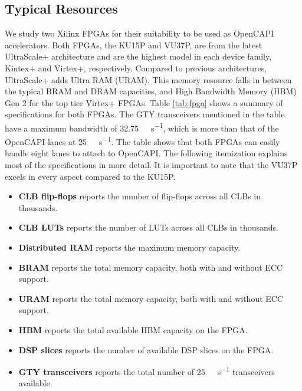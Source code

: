 \subsection{Typical Resources}
We study two Xilinx FPGAs for their suitability to be used as OpenCAPI accelerators. Both FPGAs, the KU15P and VU37P, are from the latest UltraScale+ architecture and are the highest model in each device family, Kintex+ and Virtex+, respectively. Compared to previous architectures, UltraScale+ adds Ultra RAM (URAM). This memory resource falls in between the typical BRAM and DRAM capacities, and High Bandwidth Memory (HBM) Gen 2 for the top tier Virtex+ FPGAs. Table \ref{tab:fpga} shows a summary of specifications for both FPGAs. The GTY transceivers mentioned in the table have a maximum bandwidth of \SI{32.75}{\giga\bit\per\second}, which is more than that of the OpenCAPI lanes at \SI{25}{\giga\bit\per\second}. The table shows that both FPGAs can easily handle eight lanes to attach to OpenCAPI. The following itemization explains most of the specifications in more detail. It is important to note that the VU37P excels in every aspect compared to the KU15P.
\begin{itemize}
  \item{\textbf{CLB flip-flops} reports the number of flip-flops across all CLBs in thousands.}
  \item{\textbf{CLB LUTs} reports the number of LUTs across all CLBs in thousands.}
  \item{\textbf{Distributed RAM} reports the maximum memory capacity.}
  \item{\textbf{BRAM} reports the total memory capacity, both with and without ECC support.}
  \item{\textbf{URAM} reports the total memory capacity, both with and without ECC support.}
  \item{\textbf{HBM} reports the total available HBM capacity on the FPGA.}
  \item{\textbf{DSP slices} reports the number of available DSP slices on the FPGA.}
  \item{\textbf{GTY transceivers} reports the total number of \SI{25}{\giga\bit\per\second} transceivers available.}
\end{itemize}

